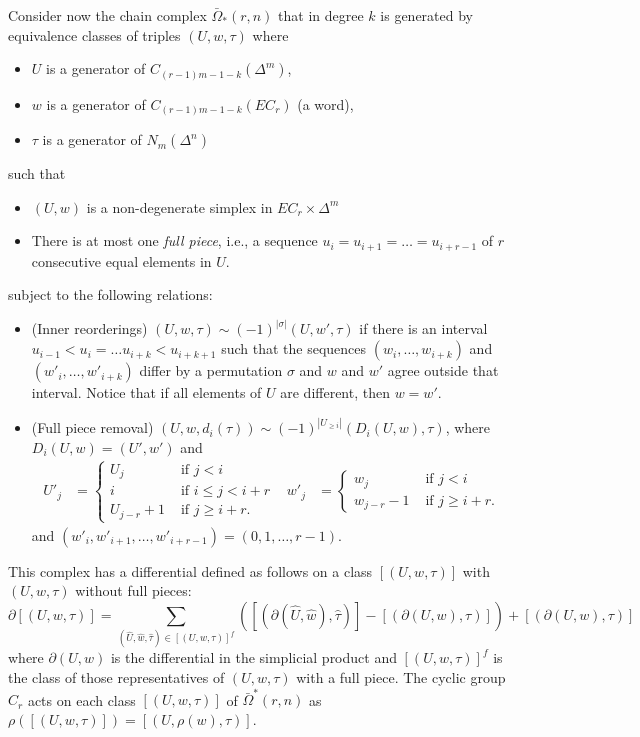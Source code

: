 Consider now the chain complex $\bar{\Omega}_*(r,n)$ that in degree $k$ is generated by equivalence classes of triples $(U,w,\tau)$ where 
\begin{itemize}
	\item $U$ is a generator of $C_{(r-1)m-1-k}(\Delta^m)$,
	\item $w$ is a generator of $C_{(r-1)m-1-k}(EC_r)$ (a word),
	\item $\tau$ is a generator of $N_m(\Delta^n)$
\end{itemize}
such that
\begin{itemize}
	\item $(U,w)$ is a non-degenerate simplex in $EC_r\times \Delta^m$
	\item There is at most one \emph{full piece}, i.e., a sequence $u_i=u_{i+1}=\ldots=u_{i+r-1}$ of $r$ consecutive equal elements in $U$.
\end{itemize}
subject to the following relations:
\begin{itemize}
	\item (Inner reorderings) $(U,w,\tau)\sim (-1)^{|\sigma|}(U,w',\tau)$ if there is an interval $u_{i-1}<u_i =\ldots u_{i+k}<u_{i+k+1}$ such that the sequences $(w_i,\ldots,w_{i+k})$ and $(w'_i,\ldots,w'_{i+k})$ differ by a permutation $\sigma$ and $w$ and $w'$ agree outside that interval. Notice that if all elements of $U$ are different, then $w=w'$.
	\item (Full piece removal) $(U,w,d_i(\tau))\sim (-1)^{|U_{\ge i}|}(D_i(U,w),\tau)$, where $D_i(U,w) = (U',w')$ and
	\begin{align*}
		U'_j &= \begin{cases} U_j &\text{ if $j<i$} \\ i & \text{ if $i\leq j < i+r$} \\ U_{j-r} + 1 & \text{ if $j\geq i+r$.}\end{cases} &
		w'_j &= \begin{cases} w_j &\text{ if $j<i$} \\ w_{j-r} - 1 & \text{ if $j\geq i+r$.}\end{cases}
	\end{align*}
	and $(w'_{i},w'_{i+1},\ldots,w'_{i+r-1}) = (0,1,\ldots,r-1)$.
\end{itemize}
This complex has a differential defined as follows on a class $[(U,w,\tau)]$ with $(U,w,\tau)$ without full pieces:
\[
\partial [(U,w,\tau)] = 
\sum_{(\hat{U},\hat{w},\hat{\tau})\in [(U,w,\tau)]^{f}} \left([(\partial(\hat{U},\hat{w}),\hat{\tau})] - [(\partial(U,w),\tau)]\right) + [(\partial(U,w),\tau)]
\]
where $\partial(U,w)$ is the differential in the simplicial product and $[(U,w,\tau)]^f$ is the class of those representatives of $(U,w,\tau)$ with a full piece. The cyclic group $C_r$ acts on each class $[(U,w,\tau)]$ of $\bar{\Omega}^*(r,n)$ as $\rho([(U,w,\tau)]) = [(U,\rho(w),\tau)]$.  


